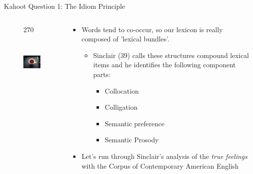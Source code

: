 \documentclass{beamer}
\begin{document}
\begin{frame}{Kahoot Question 1: The Idiom Principle}
	\begin{columns}
    	\begin{column}{6cm}
        	\begin{figure}
            	\begin{turn}{270}
                \includegraphics[height=3cm, width=3cm]{Black-tea.jpg}
                \end{turn}
            \end{figure}
        \end{column}
        \begin{column}{6cm}
        \begin{itemize}
        	\item Words tend to co-occur, so our lexicon is really composed of 'lexical bundles'.
            \begin{itemize}
                \item Sinclair (39) calls these structures compound lexical items and he identifies the following component parts:
            	\begin{itemize}
                    \item Collocation
                	\item Colligation
                    \item Semantic preference
                    \item Semantic Prosody
           		\end{itemize}
            \end{itemize}
        \item Let's run through Sinclair's analysis of the \textit{true feelings} with the Corpus of Contemporary American English
        \end{itemize}
        \end{column}
    \end{columns}
\end{frame}
\end{document}
